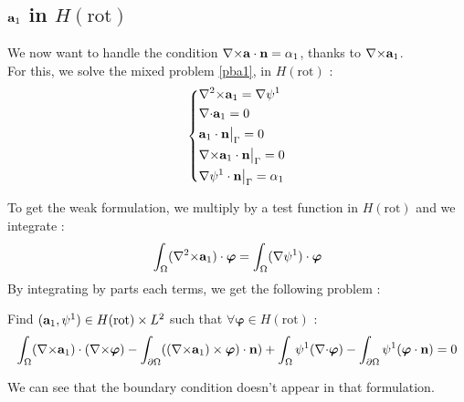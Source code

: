 \subsection{${\mathbf{a}}_1$ in $H(\mathrm{rot})$}
We now want to handle the condition ${\nabla\times}{\mathbf{a}}\cdot{\mathbf{n}}=\alpha_1$, thanks to ${\nabla\times}{\mathbf{a}}_1$.\\
For this, we solve the mixed problem \ref{pba1}, in $H(\mathrm{rot})$ : 
\begin{equation*}
  \left\{
  \begin{aligned}
    &{\nabla^2\times} {\mathbf{a}}_1 = {\nabla}\psi^1\\
    &{\nabla\cdot} {\mathbf{a}}_1 = 0\\
    &{\mathbf{a}}_1\cdot {\mathbf{n}}{\big\rvert_{\Gamma}} = 0\\
    &{\nabla\times} {\mathbf{a}}_1\cdot {\mathbf{n}}{\big\rvert_{\Gamma}} = 0\\
    &{\nabla}\psi^1\cdot {\mathbf{n}}{\big\rvert_{\Gamma}} = \alpha_1
  \end{aligned}
  \right.
\end{equation*}

To get the weak formulation, we multiply by a test function in $H(\mathrm{rot})$ and we integrate :
\[ \int_\Omega ({\nabla^2\times} {\mathbf{a}}_1)\cdot\bm{\varphi} = \int_\Omega ({\nabla}\psi^1)\cdot\bm{\varphi} \]
By integrating by parts each terms, we get the following problem :
\begin{pb} \label{fva1}
  Find $({\mathbf{a}}_1,\psi^1)\in H(\mathrm{rot})\times L^2$ such that $\forall \bm{\varphi}\in H(\mathrm{rot})$ :
  \begin{equation*}
    \int_\Omega ({\nabla\times} {\mathbf{a}}_1)\cdot({\nabla\times}\bm{\varphi}) - \int_{\partial\Omega} (({\nabla\times}{\mathbf{a}}_1)\times\bm{\varphi})\cdot {\mathbf{n}}) + \int_\Omega \psi^1({\nabla\cdot}\bm{\varphi}) - \int_{\partial\Omega} \psi^1(\bm{\varphi}\cdot {\mathbf{n}}) = 0
  \end{equation*}
\end{pb}
\begin{rk}
  We can see that the boundary condition doesn't appear in that formulation.
\end{rk}

